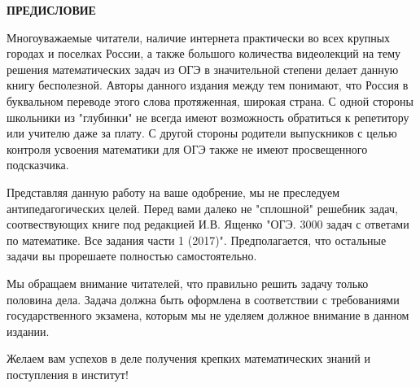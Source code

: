 {\centering \large \textbf{ПРЕДИСЛОВИЕ}

}

Многоуважаемые читатели, наличие интернета практически во всех крупных городах и поселках России, а также большого количества видеолекций на тему решения математических задач из ОГЭ в значительной степени
делает данную книгу бесполезной. Авторы данного издания между тем понимают, что Россия в буквальном переводе этого слова протяженная, широкая страна. С одной стороны школьники из "глубинки" не всегда имеют возможность обратиться к репетитору или учителю даже за плату. С другой стороны родители выпускников с целью контроля усвоения математики для ОГЭ также не имеют просвещенного подсказчика.

Представляя данную работу на ваше одобрение, мы не преследуем антипедагогических целей.
Перед вами далеко не "сплошной" решебник задач, соотвествующих книге под редакцией И.В. Ященко  "ОГЭ. 3000 задач с ответами по математике. Все задания части 1 (2017)". Предполагается, что остальные задачи вы прорешаете полностью самостоятельно.

Мы обращаем внимание читателей, что правильно решить задачу только половина дела. Задача должна быть оформлена в соответствии с требованиями государственного экзамена,
которым мы не уделяем должное внимание в данном издании. 

Желаем вам успехов в деле получения крепких математических знаний и поступления в институт!